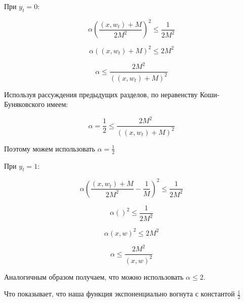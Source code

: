 \documentclass[12pt]{article}
\theoremstyle{definition}
\begin{document}
При $y_t = 0:$

$$ \alpha \left(\frac{(x, w_t) + M}{2M^2}\right)^2 \leqslant \frac{1}{2M^2}$$

$$ \alpha ((x, w_t) + M)^2 \leqslant 2M^2 $$

$$ \alpha \leqslant \frac{2M^2}{((x, w_t) + M)^2} $$

Используя рассуждения предыдущих разделов, по неравенству Коши-Буняковского имеем:

$$ \alpha = \frac{1}{2} \leqslant \frac{2M^2}{((x, w_t) + M)^2} $$

Поэтому можем использовать $\alpha = \frac{1}{2}$

При $y_t = 1:$

$$ \alpha \left(\frac{(x, w_t) + M}{2M^2} - \frac{1}{M}\right)^2 \leqslant \frac{1}{2M^2} $$

$$ \alpha \left(\right)^2 \leqslant \frac{1}{2M^2} $$

$$ \alpha (x, w)^2 \leqslant 2M^2 $$

$$ \alpha \leqslant \frac{2M^2}{(x, w)^2}$$

Аналогичным образом получаем, что можно использовать $\alpha \leqslant 2$.

Что показывает, что наша функция экспоненциально вогнута с константой $\frac{1}{2}$
\end{document}
